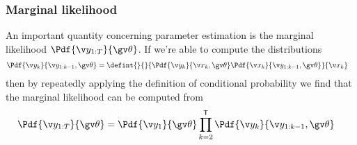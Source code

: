 \subsubsection*{Marginal likelihood}

An important quantity concerning parameter estimation is the marginal likelihood $\Pdf{\Y}{\Th}$. 
If we're able to compute the distributions
\begin{align}
	\Pdf{\y_k}{\y_{1:k-1},\Th}&=\defint{}{}{\Pdf{\yk}{\xk,\Th}\Pdf{\xk}{\y_{1:k-1},\Th}}{\xk}
\end{align}
then by repeatedly applying the definition of conditional probability 
we find that the marginal likelihood can be computed from
\begin{align}
	\Pdf{\Y}{\Th}&=\Pdf{\y_1}{\Th}\prod_{k=2}^\tr \Pdf{\y_k}{\y_{1:k-1},\Th}
	\label{eq:lh_factorization}
\end{align}





